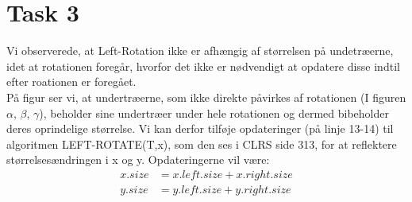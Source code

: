 \section{Task 3}

Vi observerede, at Left-Rotation ikke er afhængig af størrelsen på undetræerne, idet at rotationen foregår, hvorfor det ikke er nødvendigt at opdatere disse indtil efter roationen er foregået.\\
På figur  ser vi, at undertræerne, som ikke direkte påvirkes af rotationen (I figuren $\alpha$, $\beta$, $\gamma$), beholder sine undertræer under hele rotationen og dermed bibeholder deres oprindelige størrelse.
Vi kan derfor tilføje opdateringer (på linje 13-14) til algoritmen LEFT-ROTATE(T,x), som den ses i CLRS side 313, for at reflektere størrelsesændringen i x og y. Opdateringerne vil være:
\begin{align*}
  x.size &= x.left.size + x.right.size\\
  y.size &= y.left.size + y.right.size
\end{align*}
